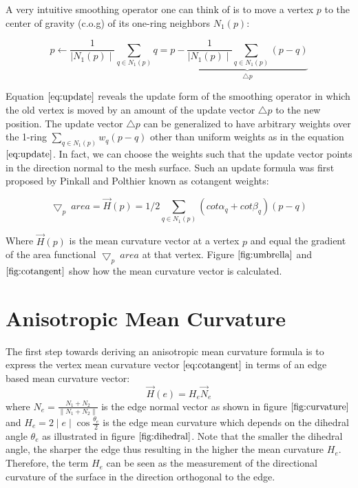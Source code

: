 \documentclass[11pt]{article}
\begin{document}
A very intuitive smoothing operator one can think of is to move a vertex $p$ to the center of gravity (c.o.g) of its one-ring neighbors $N_1(p)$:

\begin{equation}
p \leftarrow \frac{1}{\mid N_1(p) \mid}\sum\limits_{q \in N_1(p)}q = p - \underbrace{\frac{1}{\mid N_1(p) \mid}\sum\limits_{q \in N_1(p)}(p - q)}_{\bigtriangleup p}
\label{eq:update}
\end{equation}

Equation $\ref{eq:update}$ reveals the update form of the smoothing operator in which the old vertex is moved by an amount of the update vector $\bigtriangleup p$ to the new position. The update vector $\bigtriangleup p$ can be generalized to have arbitrary weights over the 1-ring $\sum\limits_{q \in N_1(p)}w_q(p - q)$ other than uniform weights as in the equation $\ref{eq:update}$. In fact, we can choose the weights such that the update vector points in the direction normal to the mesh surface. Such an update formula was first proposed by Pinkall and Polthier \cite{Pinkall93computingdiscrete} known as cotangent weights:

\begin{equation}
\bigtriangledown_p\ area = \vec{H}(p) = 1/2\sum\limits_{q \in N_1(p)}{(cot\alpha_{q} + cot\beta_{q})(p-q)}
\label{eq:cotangent}
\end{equation}

Where $\vec{H}(p)$ is the mean curvature vector at a vertex $p$ and equal the gradient of the area functional $\bigtriangledown_p\ area$ at that vertex. Figure $\ref{fig:umbrella}$ and $\ref{fig:cotangent}$ show how the mean curvature vector is calculated.

\section{Anisotropic Mean Curvature}

The first step towards deriving an anisotropic mean curvature formula is to express the vertex mean curvature vector $\ref{eq:cotangent}$ in terms of an edge based mean curvature vector:
\begin{equation}
  \vec{H}(e) = H_e \vec{N}_e
  \label{eq:edgeMC}
\end{equation}
where $N_e = \frac{N_1 + N_2}{\parallel N_1 + N_2 \parallel}$ is the edge normal vector as shown in figure $\ref{fig:curvature}$ and $H_e = 2\mid e \mid \cos \frac{\theta_e}{2}$ is the edge mean curvature which depends on the dihedral angle $\theta_e$ as illustrated in figure $\ref{fig:dihedral}$. Note that the smaller the dihedral angle, the sharper the edge thus resulting in the higher the mean curvature $H_e$. Therefore, the term $H_e$ can be seen as the measurement of the directional curvature of the surface in the direction orthogonal to the edge.
\end{document}
